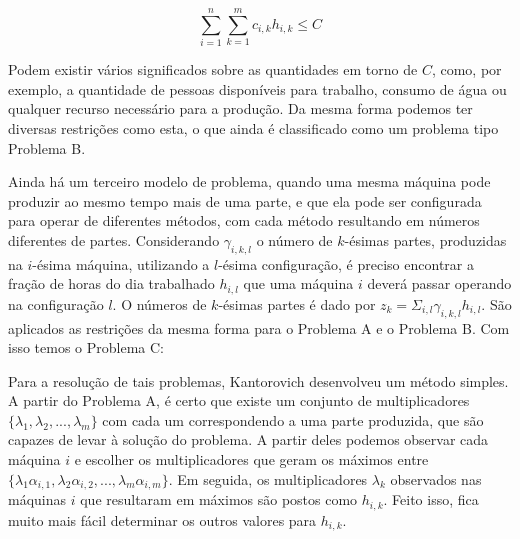 \begin{equation}
  \sum_{i=1}^n \sum_{k=1}^m c_{i, k} h_{i, k} \leq C
\end{equation}

Podem existir vários significados sobre as quantidades em torno de \(C\), como, por exemplo,
a quantidade de pessoas disponíveis para trabalho, consumo de água ou qualquer recurso
necessário para a produção. Da mesma forma podemos ter diversas restrições como esta,
o que ainda é classificado como um problema tipo Problema B.

Ainda há um terceiro modelo de problema, quando uma mesma máquina pode produzir ao mesmo tempo
mais de uma parte, e que ela pode ser configurada para operar de diferentes métodos, com cada
método resultando em números diferentes de partes. Considerando \( \gamma_{i, k, l} \) o número de
\(k\)-ésimas partes, produzidas na \(i\)-ésima máquina, utilizando a \(l\)-ésima configuração,
é preciso encontrar a fração de horas do dia trabalhado \(h_{i, l}\) que uma máquina \(i\) deverá
passar operando na configuração \(l\). O números de \(k\)-ésimas partes é dado por
\( z_k = \Sigma_{i, l} \gamma_{i, k, l} h_{i, l}\). São aplicados as restrições da mesma forma para o Problema
A e o Problema B. Com isso temos o Problema C:

\begin{maxi!}
{}{  \label{kobj}}{\label{prob_kantorovich}}{}
\end{maxi!}

Para a resolução de tais problemas, Kantorovich desenvolveu um método simples. A partir do
Problema A, é certo que existe um conjunto de multiplicadores \(\{ \lambda_1, \lambda_2, ..., \lambda_m \}\) com
cada um correspondendo a uma parte produzida, que são capazes de levar à solução do problema.
A partir deles podemos observar cada máquina \(i\) e escolher os multiplicadores que geram os
máximos entre \(\{\lambda_1\alpha_{i, 1}, \lambda_2\alpha_{i, 2}, ..., \lambda_m\alpha_{i, m}\}\). Em seguida, os multiplicadores \( \lambda_k \)
observados nas máquinas \(i\) que resultaram em máximos são postos como \(h_{i, k}\). Feito isso,
fica muito mais fácil determinar os outros valores para \( h_{i, k} \).


